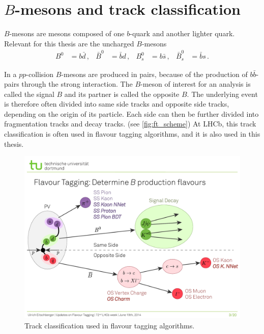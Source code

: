 \section{$B$-mesons and track classification}

$B$-mesons are mesons composed of one $b$-quark and another lighter quark.
Relevant for this thesis are the uncharged $B$-mesons
\begin{align*}
    B^0 &= b\bar{d} \, , & \bar{B}^0 &= \bar{b}d \, , & B_s^0 &= b\bar{s} \, , & \bar{B}_s^0 &= \bar{b}s \, .
\end{align*}
    
In a $pp$-collision $B$-mesons are produced in pairs, because of the production of $b\bar{b}$-pairs through the strong interaction. 
The $B$-meson of interest for an analysis is called the signal $B$ and its partner is called the opposite $B$.
The underlying event is therefore often divided into same side tracks and opposite side tracks, depending on the origin of its particle.
Each side can then be further divided into fragmentation tracks and decay tracks. (see \autoref{fig:ft_scheme})
At LHCb, this track classification is often used in flavour tagging algorithms, and it is also used in this thesis.

\begin{figure}
    \centering
    \includegraphics[width=\textwidth]{images/FlavourTaggingScheme.pdf}
    \caption{Track classification used in flavour tagging algorithms. \cite{ft_scheme}}
    \label{fig:ft_scheme}
\end{figure}


